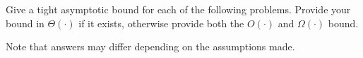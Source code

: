 Give a tight asymptotic bound for each of the following problems. Provide your
bound in $\Theta(\cdot)$ if it exists, otherwise provide both the $O(\cdot)$
and $\Omega(\cdot)$ bound.

\begin{solution}
Note that answers may differ depending on the assumptions made.
\end{solution}
